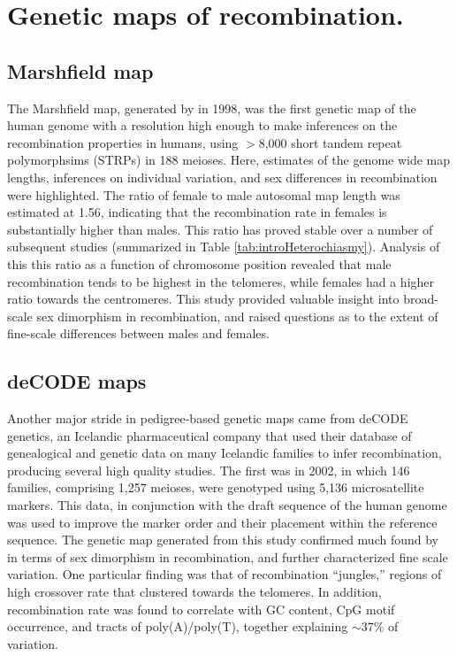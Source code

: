 \section{Genetic maps of recombination.}

\subsection{Marshfield map}
The Marshfield map, generated by \citet{Broman1998} in 1998, was the first genetic map of the human genome with a resolution high enough to make inferences on the recombination properties in humans, using $>$8,000 short tandem repeat polymorphsims (STRPs) in 188 meioses.
Here, estimates of the genome wide map lengths, inferences on individual variation, and sex differences in recombination were highlighted.
The ratio of female to male autosomal map length was estimated at 1.56, indicating that the recombination rate in females is substantially higher than males.
This ratio has proved stable over a number of subsequent studies (summarized in Table \ref{tab:introHeterochiasmy}).
Analysis of this this ratio as a function of chromosome position revealed that male recombination tends to be highest in the telomeres, while females had a higher ratio towards the centromeres.
This study provided valuable insight into broad-scale sex dimorphism in recombination, and raised questions as to the extent of fine-scale differences between males and females.

\subsection{deCODE maps}
Another major stride in pedigree-based genetic maps came from deCODE genetics, an Icelandic pharmaceutical company that used their database of genealogical and genetic data on many Icelandic families to infer recombination, producing several high quality studies.
The first was in 2002, in which 146 families, comprising 1,257 meioses, were genotyped using 5,136 microsatellite markers\cite{Kong2002}.
This data, in conjunction with the draft sequence of the human genome\cite{Venter2001,Lander2001} was used to improve the marker order and their placement within the reference sequence.
The genetic map generated from this study confirmed much found by \citet{Broman1998} in terms of sex dimorphism in recombination, and further characterized fine scale variation.
One particular finding was that of recombination ``jungles,'' regions of high crossover rate that clustered towards the telomeres.
In addition, recombination rate was found to correlate with GC content, CpG motif occurrence, and tracts of poly(A)/poly(T), together explaining $\sim$37\% of variation.

